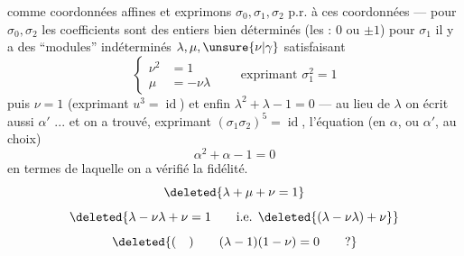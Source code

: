 comme coordonnées affines et  exprimons
$\sigma_0,\sigma_1,\sigma_2$ p.r. à ces coordonnées --- pour
$\sigma_0,\sigma_2$ les coefficients sont des entiers bien déterminés
(les  : $0$ ou $\pm1$) pour $\sigma_1$ il y a
des ``modules'' indéterminés $\lambda,\mu,\unsure{\nu|\gamma}$ satisfaisant
\[
\left\{\begin{aligned}
\nu^2&=1\\
\mu&=-\nu\lambda
\end{aligned}\right.\qquad\text{exprimant }\sigma_1^2=1
\]
puis $\nu=1$ (exprimant $u^3=\operatorname{id}$)
et enfin $\lambda^2+\lambda-1=0$
--- au lieu de $\lambda$ on écrit aussi $\alpha'$ ... et on a trouvé,
exprimant $(\sigma_1\sigma_2)^5=\operatorname{id}$, l'équation
(en $\alpha$, ou $\alpha'$, au choix)
\[
\alpha^2+\alpha-1=0
\]
en termes de laquelle on a vérifié la fidélité.
\[
\deleted{\lambda+\mu+\nu=1}
\]
\[
\deleted{\lambda-\nu\lambda+\nu=1\qquad\text{i.e. }\deleted{(\lambda-\nu\lambda)+\nu}}
\]
\[
\deleted{(\quad)\qquad(\lambda-1)(1-\nu)=0\qquad?}
\]


